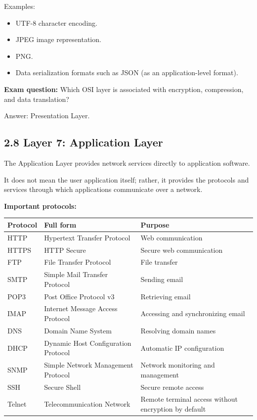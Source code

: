 Examples:

\begin{itemize}
    \item UTF-8 character encoding.
    \item JPEG image representation.
    \item PNG.
    \item Data serialization formats such as JSON (as an application-level format).
\end{itemize}

\textbf{Exam question:} Which OSI layer is associated with encryption, compression, and data translation?

Answer: Presentation Layer.

\subsection{2.8 Layer 7: Application Layer}

The Application Layer provides network services directly to application software.

It does not mean the user application itself; rather, it provides the protocols and services through which applications communicate over a network.

\textbf{Important protocols:}

\begin{table}[htbp]
\centering
\begin{tabularx}{\textwidth}{p{2.6cm} X X}
\toprule
\textbf{Protocol} & \textbf{Full form} & \textbf{Purpose} \\
\midrule
HTTP & Hypertext Transfer Protocol & Web communication \\
HTTPS & HTTP Secure & Secure web communication \\
FTP & File Transfer Protocol & File transfer \\
SMTP & Simple Mail Transfer Protocol & Sending email \\
POP3 & Post Office Protocol v3 & Retrieving email \\
IMAP & Internet Message Access Protocol & Accessing and synchronizing email \\
DNS & Domain Name System & Resolving domain names \\
DHCP & Dynamic Host Configuration Protocol & Automatic IP configuration \\
SNMP & Simple Network Management Protocol & Network monitoring and management \\
SSH & Secure Shell & Secure remote access \\
Telnet & Telecommunication Network & Remote terminal access without encryption by default \\
\bottomrule
\end{tabularx}
\end{table}

